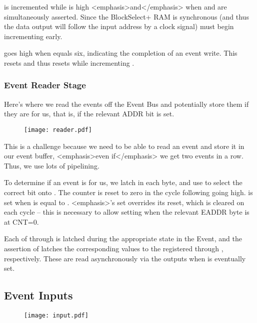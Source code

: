  is incremented while 
is high <emphasis>and</emphasis> when  and
 are simultaneously asserted. Since the
BlockSelect+ RAM is synchronous (and thus the data output will follow
the input address by a clock signal)  must
begin incrementing early.

 goes high when  equals
six, indicating the completion of an event write. This resets
 and thus resets 
while incrementing .  
    

\subsubsection{Event Reader Stage}

Here's where we read the events off the Event Bus and potentially
store them if they are for us, that is, if the relevant ADDR bit is
set.


\begin{figure}[h!]
\texttt{[image: reader.pdf]}
\end{figure}
      
This is a challenge because we need to be able to read an event and
store it in our event buffer, <emphasis>even if</emphasis> we get two
events in a row. Thus, we use lots of pipelining.

To determine if an event is for us, we latch in each
 byte, and use 
to select the correct bit onto . The counter
 is reset to zero in the cycle following
 going high.  is set when
 is equal to .
<emphasis>'s set overrides its reset, which is
cleared on each cycle -- this is necessary to allow setting when the
relevant EADDR byte is at CNT=0. 

Each of  through  is
latched during the appropriate state in the Event, and the assertion
of  latches the corresponding values to the
registered  through
, respectively. These are read
asynchronously via the outputs when  is
eventually set.

\subsection{Event Inputs} 

\begin{figure}[h!]
\texttt{[image: input.pdf]}
\end{figure}

